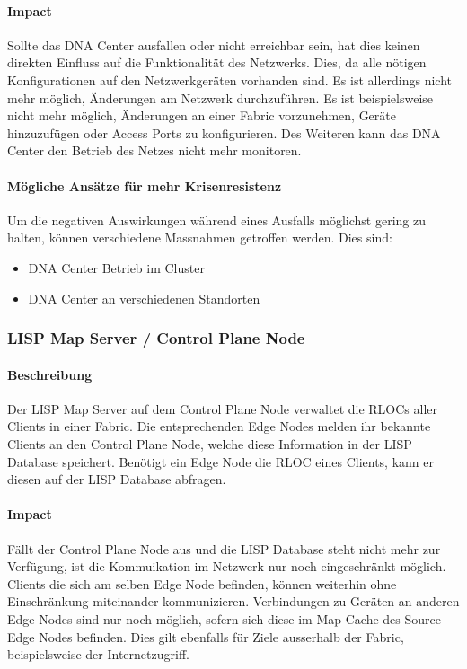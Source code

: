 \paragraph{Impact}

Sollte das DNA Center ausfallen oder nicht erreichbar sein, hat dies keinen direkten Einfluss auf die Funktionalität des Netzwerks. Dies, da alle nötigen Konfigurationen auf den Netzwerkgeräten vorhanden sind. Es ist allerdings nicht mehr möglich, Änderungen am Netzwerk durchzuführen. Es ist beispielsweise nicht mehr möglich, Änderungen an einer Fabric vorzunehmen, Geräte hinzuzufügen oder Access Ports zu konfigurieren. Des Weiteren kann das DNA Center den Betrieb des Netzes nicht mehr monitoren.

\paragraph{Mögliche Ansätze für mehr Krisenresistenz}

Um die negativen Auswirkungen während eines Ausfalls möglichst gering zu halten, können verschiedene Massnahmen getroffen werden. Dies sind:

\begin{itemize}
\item DNA Center Betrieb im Cluster
\item DNA Center an verschiedenen Standorten
\end{itemize}

\subsubsection{LISP Map Server / Control Plane Node}

\paragraph{Beschreibung}

Der LISP Map Server auf dem Control Plane Node verwaltet die RLOCs aller Clients in einer Fabric. Die entsprechenden Edge Nodes melden ihr bekannte Clients an den Control Plane Node, welche diese Information in der LISP Database speichert. Benötigt ein Edge Node die RLOC eines Clients, kann er diesen auf der LISP Database abfragen.

\paragraph{Impact}

Fällt der Control Plane Node aus und die LISP Database steht nicht mehr zur Verfügung, ist die Kommuikation im Netzwerk nur noch eingeschränkt möglich. Clients die sich am selben Edge Node befinden, können weiterhin ohne Einschränkung miteinander kommunizieren. Verbindungen zu Geräten an anderen Edge Nodes sind nur noch möglich, sofern sich diese im Map-Cache des Source Edge Nodes befinden. Dies gilt ebenfalls für Ziele ausserhalb der Fabric, beispielsweise der Internetzugriff.

